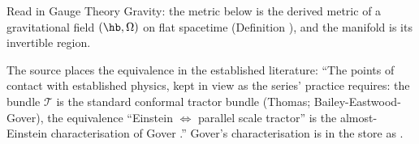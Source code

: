 Read in Gauge Theory Gravity: the metric below is the derived metric of a gravitational field $(\hb, \Omega)$ on flat spacetime (Definition ), and the manifold is its invertible region.

The source places the equivalence in the established literature: ``The points of contact with established physics, kept in view as the series' practice requires: the bundle $\mathcal{T}$ is the standard conformal tractor bundle (Thomas; Bailey-Eastwood-Gover), the equivalence ``Einstein $\Leftrightarrow$ parallel scale tractor'' is the almost-Einstein characterisation of Gover \cite{Gover2010}.'' Gover's characterisation is in the store as .
